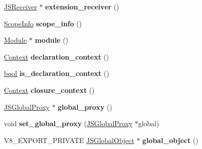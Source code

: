 \begin{DoxyCompactItemize}
\mbox{\hyperlink{classv8_1_1internal_1_1JSReceiver}{J\+S\+Receiver}} $\ast$ {\bfseries extension\+\_\+receiver} ()
\item 
\mbox{\label{classv8_1_1internal_1_1Context_a9217071c3b8c9b1a64683a4f4a37fb43}} 
\mbox{\hyperlink{classv8_1_1internal_1_1ScopeInfo}{Scope\+Info}} {\bfseries scope\+\_\+info} ()
\item 
\mbox{\label{classv8_1_1internal_1_1Context_ad88510bb28a179b743d1c130243a1021}} 
\mbox{\hyperlink{classv8_1_1internal_1_1Module}{Module}} $\ast$ {\bfseries module} ()
\item 
\mbox{\label{classv8_1_1internal_1_1Context_a0697a3e2d270dd8c16229b48dca382ca}} 
\mbox{\hyperlink{classv8_1_1internal_1_1Context}{Context}} {\bfseries declaration\+\_\+context} ()
\item 
\mbox{\label{classv8_1_1internal_1_1Context_a9407c44cff3630800db53a42c2aece7b}} 
\mbox{\hyperlink{classbool}{bool}} {\bfseries is\+\_\+declaration\+\_\+context} ()
\item 
\mbox{\label{classv8_1_1internal_1_1Context_a30252f31acb7052035473849bf8a1387}} 
\mbox{\hyperlink{classv8_1_1internal_1_1Context}{Context}} {\bfseries closure\+\_\+context} ()
\item 
\mbox{\label{classv8_1_1internal_1_1Context_a43c6ae7e7a4f5abe36d01a94444841b3}} 
\mbox{\hyperlink{classv8_1_1internal_1_1JSGlobalProxy}{J\+S\+Global\+Proxy}} $\ast$ {\bfseries global\+\_\+proxy} ()
\item 
\mbox{\label{classv8_1_1internal_1_1Context_aa1e231c36970f4de902b8167e364df1b}} 
void {\bfseries set\+\_\+global\+\_\+proxy} (\mbox{\hyperlink{classv8_1_1internal_1_1JSGlobalProxy}{J\+S\+Global\+Proxy}} $\ast$global)
\item 
\mbox{\label{classv8_1_1internal_1_1Context_a47428af9a447cc66be35e6a2f9486129}} 
V8\+\_\+\+E\+X\+P\+O\+R\+T\+\_\+\+P\+R\+I\+V\+A\+TE \mbox{\hyperlink{classv8_1_1internal_1_1JSGlobalObject}{J\+S\+Global\+Object}} $\ast$ {\bfseries global\+\_\+object} ()

\end{DoxyCompactItemize}
